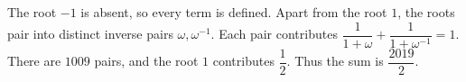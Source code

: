 The root $-1$ is absent, so every term is defined. Apart from the root $1$, the roots pair into distinct inverse pairs $\omega,\omega^{-1}$. Each pair contributes $\dfrac{1}{1+\omega}+\dfrac{1}{1+\omega^{-1}}=1$. There are $1009$ pairs, and the root $1$ contributes $\dfrac{1}{2}$. Thus the sum is $\boxed{\dfrac{2019}{2}}$.
